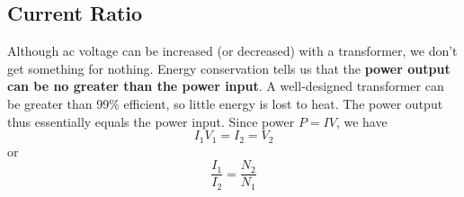 \documentclass[math,code]{amznotes}
\theoremstyle{remark}
\begin{document}
\subsection{Current Ratio}
Although ac voltage can be increased (or decreased) with a transformer, we don't get something for nothing. Energy conservation tells us that the  \textbf{power output can be no greater than the power input}. A well-designed transformer can be greater than 99\% efficient, so little energy is lost to heat. The power output thus essentially equals the power input. Since power $P=IV$, we have
\begin{equation}
    I_1V_1=I_2=V_2
\end{equation}
or
\begin{equation} \label{eq:current-ratio-transformer}
    \frac{I_1}{I_2} = \frac{N_2}{N_1}
\end{equation}
\end{document}
